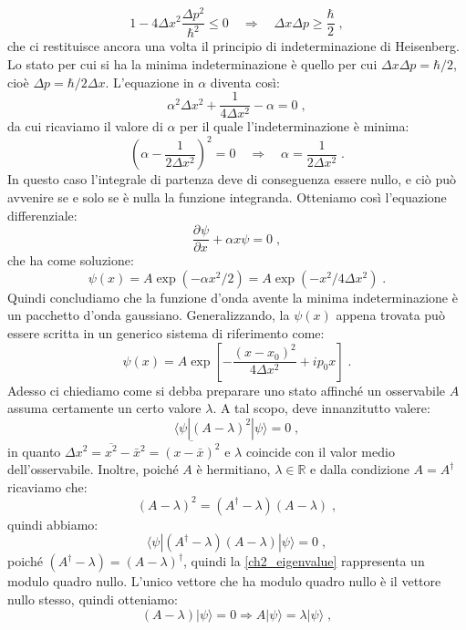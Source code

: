 \documentclass[12pt,a4paper]{report}
\theoremstyle{definition}
\newcommand{\pdev}[3][]{\frac{\partial^{#1} #2}{\partial #3^{#1}}}
\numberwithin{equation}{section}
\newcommand{\bra}{\langle}
\newcommand{\ket}{\rangle}
\begin{document}
 \begin{equation}
  1-4\Delta x^2\frac{\Delta p^2}{\hbar^2} \le 0 \quad \Longrightarrow\quad  \Delta x\Delta p\ge \frac{\hbar}{2}\;,
 \end{equation}
 che ci restituisce ancora una volta il principio di indeterminazione di Heisenberg. Lo stato per cui si ha la minima indeterminazione è 
 quello per cui $\Delta x\Delta p=\hbar/2$, cioè $\Delta p=\hbar/2\Delta x$. L'equazione in $\alpha$ diventa così:
 $$
 \alpha^2\Delta x^2+\frac{1}{4\Delta x^2}-\alpha=0\;,
 $$
 da cui ricaviamo il valore di $\alpha$ per il quale l'indeterminazione è minima:
 $$
 \left(\alpha-\frac{1}{2\Delta x^2}\right)^2=0\quad \Longrightarrow\quad \alpha=\frac{1}{2\Delta x^2}\;.
 $$
 In questo caso l'integrale di partenza deve di conseguenza essere nullo, e ciò può avvenire se e solo se è nulla la funzione integranda. Otteniamo così l'equazione differenziale:
 \begin{equation}
  \pdev{\psi}{x}+\alpha x \psi=0\;,
 \end{equation}
 che ha come soluzione:
 $$
 \psi(x)=A\exp(-\alpha x^2/2)=A\exp(-x^2/4\Delta x^2)\;.
 $$
Quindi concludiamo che la funzione d'onda avente la minima indeterminazione è un pacchetto d'onda gaussiano. Generalizzando, la $\psi(x)$ appena trovata può essere scritta in un generico sistema di riferimento come:
$$
\psi(x)=A\exp\left[-\frac{(x-x_0)^2}{4\Delta x^2}+ip_0 x\right]\;.
$$
Adesso ci chiediamo come si debba preparare uno stato affinché un osservabile $A$ assuma certamente un certo valore $\lambda$. 
A tal scopo, deve innanzitutto valere:
\begin{equation}
 \bra \psi|(A-\lambda)^2|\psi\ket=0\;, \label{ch2_eigenvalue}
\end{equation}
in quanto $\Delta x^2=\overline{x^2}-\bar{x}^2=\overline{(x-\bar{x})^2}$ e $\lambda$ coincide con il valor medio dell'osservabile. 
Inoltre, poiché $A$ è hermitiano, $\lambda\in\mathbb{R}$ e dalla condizione $A=A^{\dagger}$ ricaviamo che:
$$
(A-\lambda)^2=(A^{\dagger}-\lambda)(A-\lambda)\;,
$$
quindi abbiamo:
\begin{equation}
 \bra \psi|(A^{\dagger}-\lambda)(A-\lambda)|\psi\ket=0\;,
\end{equation}
poiché $(A^{\dagger}-\lambda)=(A-\lambda)^{\dagger}$, quindi la \eqref{ch2_eigenvalue} rappresenta un modulo quadro nullo. L'unico vettore che ha modulo quadro nullo è il vettore nullo stesso, quindi otteniamo:
\begin{equation}
 (A-\lambda)|\psi\ket=0 \Longrightarrow A|\psi\ket=\lambda|\psi\ket\;,
\end{equation}
\end{document}
